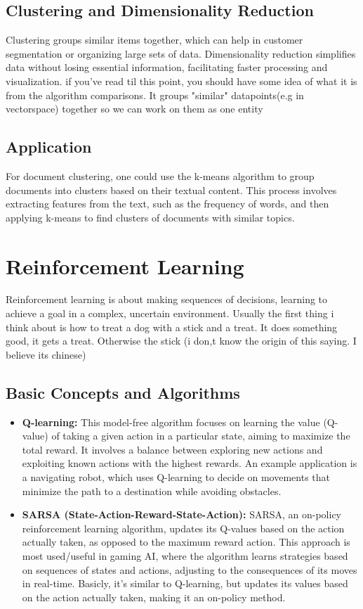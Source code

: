 \documentclass[11pt, a4paper]{article}
\begin{document}
\subsection{Clustering and Dimensionality Reduction}
Clustering groups similar items together, which can help in customer segmentation or organizing large sets of data. Dimensionality reduction simplifies data without losing essential information, facilitating faster processing and visualization. if you've read til this point, you should have some idea of what it is from the algorithm comparisons. It groups "similar" datapoints(e.g in vectorspace) together so we can work on them as one entity

\subsection{Application}
For document clustering, one could use the k-means algorithm to group documents into clusters based on their textual content. This process involves extracting features from the text, such as the frequency of words, and then applying k-means to find clusters of documents with similar topics.

\section{Reinforcement Learning}
Reinforcement learning is about making sequences of decisions, learning to achieve a goal in a complex, uncertain environment. Usually the first thing i think about is how to treat a dog with a stick and a treat. It does something good, it gets a treat. Otherwise the stick (i don,t know the origin of this saying. I believe its chinese)

\subsection{Basic Concepts and Algorithms}
\begin{itemize}
    \item \textbf{Q-learning:} This model-free algorithm focuses on learning the value (Q-value) of taking a given action in a particular state, aiming to maximize the total reward. It involves a balance between exploring new actions and exploiting known actions with the highest rewards. An example application is a navigating robot, which uses Q-learning to decide on movements that minimize the path to a destination while avoiding obstacles.
    
    \item \textbf{SARSA (State-Action-Reward-State-Action):} SARSA, an on-policy reinforcement learning algorithm, updates its Q-values based on the action actually taken, as opposed to the maximum reward action. This approach is most used/useful in gaming AI, where the algorithm learns strategies based on sequences of states and actions, adjusting to the consequences of its moves in real-time. Basicly, it's similar to Q-learning, but updates its values based on the action actually taken, making it an on-policy method.
    
\end{itemize}
\end{document}
